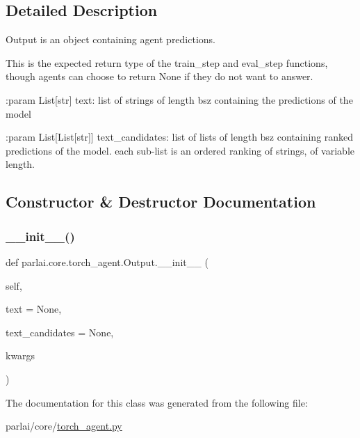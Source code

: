\subsection{Detailed Description}
\begin{DoxyVerb}Output is an object containing agent predictions.

This is the expected return type of the train_step and eval_step functions,
though agents can choose to return None if they do not want to answer.

:param List[str] text:
    list of strings of length bsz containing the predictions of the model

:param List[List[str]] text_candidates:
    list of lists of length bsz containing ranked predictions of the model.
    each sub-list is an ordered ranking of strings, of variable length.
\end{DoxyVerb}
 

\subsection{Constructor \& Destructor Documentation}
\mbox{\label{classparlai_1_1core_1_1torch__agent_1_1Output_a490f5e29040c643f20b63c23e7359627}} 
\subsubsection{\texorpdfstring{\+\_\+\+\_\+init\+\_\+\+\_\+()}{\_\_init\_\_()}}
{\footnotesize\ttfamily def parlai.\+core.\+torch\+\_\+agent.\+Output.\+\_\+\+\_\+init\+\_\+\+\_\+ (\begin{DoxyParamCaption}\item[{}]{self,  }\item[{}]{text = {\ttfamily None},  }\item[{}]{text\+\_\+candidates = {\ttfamily None},  }\item[{}]{kwargs }\end{DoxyParamCaption})}



The documentation for this class was generated from the following file\+:\begin{DoxyCompactItemize}
\item 
parlai/core/\hyperlink{torch__agent_8py}{torch\+\_\+agent.\+py}\end{DoxyCompactItemize}
